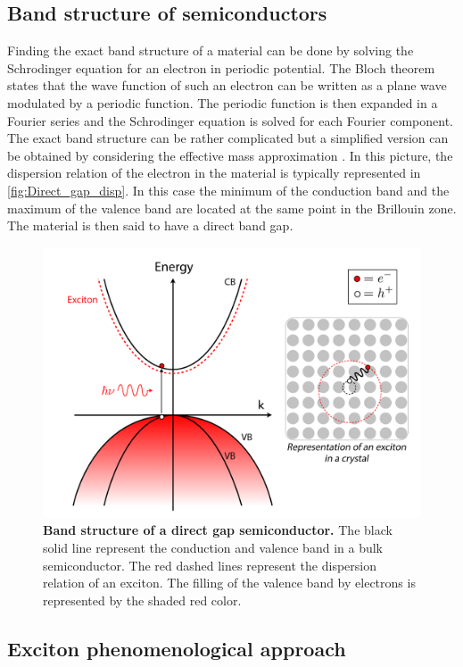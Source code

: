 \subsection{Band structure of semiconductors}

Finding the exact band structure of a material can be done by solving the Schrodinger equation for an electron in periodic potential.
 The Bloch theorem states that the wave function of such an electron can be written as a plane wave modulated by a periodic function. The periodic function is then expanded in a Fourier series and the Schrodinger equation is solved for each Fourier component. 
 The exact band structure can be rather complicated but a simplified version can be obtained by considering the effective mass approximation \cite{kittel_introduction_2005}. In this picture, the dispersion relation of the electron in the material is typically represented in \autoref{fig:Direct_gap_disp}.
In this case the minimum of the conduction band and the maximum of the valence band are located at the same point in the Brillouin zone. The material is then said to have a direct band gap.
\begin{figure}[h]
    \centering
    \includegraphics[width=0.8\linewidth]{chap2_theory/fig/DirectGapDisp.png}
    \caption{\textbf{Band structure of a direct gap semiconductor.} The black solid line represent the conduction and valence band in a bulk semiconductor. The red dashed lines represent the dispersion relation of an exciton. The filling of the valence band by electrons is represented by the shaded red color.}
    \label{fig:Direct_gap_disp}
\end{figure}


\subsection{Exciton phenomenological approach}

